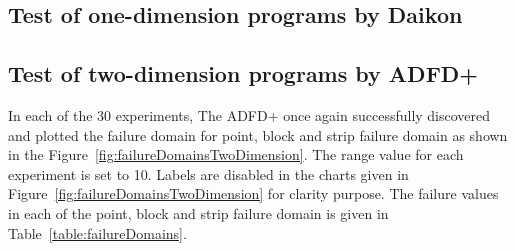 \subsection{Test of one-dimension programs by Daikon}


\subsection{Test of two-dimension programs by ADFD+}\label{sec:intro6_11}
In each of the 30 experiments, The ADFD+ once again successfully discovered and plotted the failure domain for point, block and strip failure domain as shown in the Figure~\ref{fig:failureDomainsTwoDimension}. The range value for each experiment is set to 10. Labels are disabled in the charts given in Figure~\ref{fig:failureDomainsTwoDimension} for clarity purpose. The failure values in each of the point, block and strip failure domain is given in Table~\ref{table:failureDomains}. 


